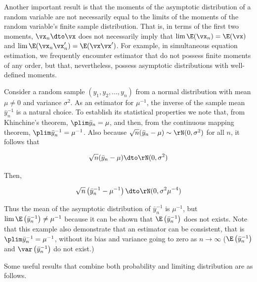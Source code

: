 \documentclass[english,12pt]{book}\usepackage[]{graphicx}\usepackage[]{xcolor}
\begin{document}
Another important result is that the moments of the asymptotic distribution of a random variable are not necessarily equal to the limits of the moments of the random variable's finite sample distribution. That is, in terms of the first two moments, $\vx_n\dto \vx$ does not necessarily imply that $\lim \E(\vx_n) = \E(\vx)$ and $\lim \E(\vx_n\vx_n') = \E(\vx\vx')$. For example, in simultaneous equation estimation, we frequently encounter estimator that do not possess finite moments of any order, but that, nevertheless, possess asymptotic distributions with well-defined moments.

\begin{example}
Consider a random sample $(y_1, y_2,...,y_n)$ from a normal distribution with mean $\mu \neq 0$ and variance $\sigma^2$. As an estimator for $\mu^{-1}$, the inverse of the sample mean $\bar{y}_n^{-1}$ is a natural choice. To establish its statistical properties we note that, from Khinchine's theorem, $\plim \bar{y}_n = \mu$, and then, from the continuous mapping theorem, $\plim \bar{y}_n^{-1} = \mu^{-1}$. Also because $\sqrt{n}(\bar{y}_n - \mu)\sim \rN(0, \sigma^2)$ for all $n$, it follows that

\begin{equation*}
  \sqrt{n}(\bar{y}_n - \mu)\dto \rN(0, \sigma^2)
\end{equation*}

Then, 

\begin{equation*}
  \sqrt{n}\left(\bar{y}_n^{-1} - \mu^{-1}\right)\dto \rN(0, \sigma^2\mu^{-4})
\end{equation*}

Thus the mean of the asymptotic distribution of $\bar{y}_n^{-1}$ is $\mu^{-1}$, but $\lim \E\left(\bar{y}_n^{-1}\right)\neq \mu^{-1}$ because it can be shown that $\E\left(\bar{y}_n^{-1}\right)$ does not exists. Note that this example also demonstrate that an estimator can be consistent, that is $\plim \bar{y}_n^{-1} = \mu^{-1}$, without its bias and variance going to zero as $n\to\infty$ ($\E\left(\bar{y}_n^{-1}\right)$ and $\var\left(\bar{y}_n^{-1}\right)$ do not exist.)
\end{example}

Some useful results that combine both probability and limiting distribution are as follows.
\end{document}
